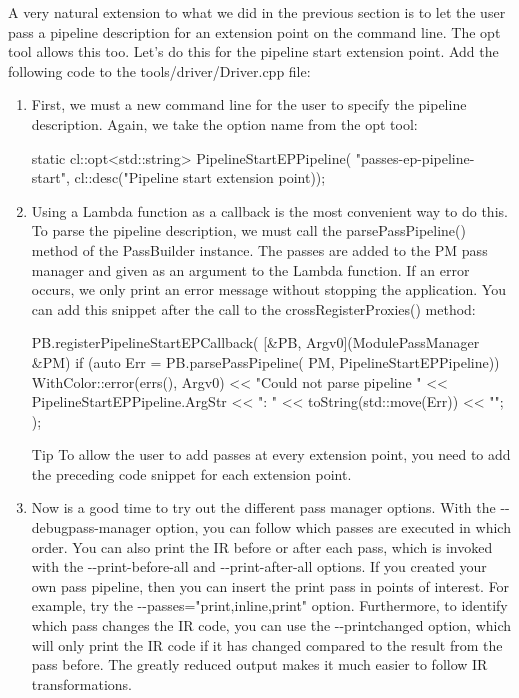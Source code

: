 A very natural extension to what we did in the previous section is to let the user pass a pipeline description for an extension point on the command line. The opt tool allows this too. Let’s do this for the pipeline start extension point. Add the following code to the tools/driver/Driver.cpp file:

\begin{enumerate}
\item
First, we must a new command line for the user to specify the pipeline description. Again, we take the option name from the opt tool:

\begin{cpp}
static cl::opt<std::string> PipelineStartEPPipeline(
    "passes-ep-pipeline-start",
    cl::desc("Pipeline start extension point));
\end{cpp}

\item
Using a Lambda function as a callback is the most convenient way to do this. To parse the pipeline description, we must call the parsePassPipeline() method of the PassBuilder instance. The passes are added to the PM pass manager and given as an argument to the Lambda function. If an error occurs, we only print an error message without stopping the application. You can add this snippet after the call to the crossRegisterProxies() method:

\begin{cpp}
PB.registerPipelineStartEPCallback(
[&PB, Argv0](ModulePassManager &PM) {
    if (auto Err = PB.parsePassPipeline(
            PM, PipelineStartEPPipeline)) {
        WithColor::error(errs(), Argv0)
            << "Could not parse pipeline "
            << PipelineStartEPPipeline.ArgStr << ": "
            << toString(std::move(Err)) << "\n";
    }
});
\end{cpp}

\begin{myTip}{Tip}
To allow the user to add passes at every extension point, you need to add the preceding code snippet for each extension point.
\end{myTip}

\item
Now is a good time to try out the different pass manager options. With the -{}-debugpass-manager option, you can follow which passes are executed in which order. You can also print the IR before or after each pass, which is invoked with the -{}-print-before-all and -{}-print-after-all options. If you created your own pass pipeline, then you can insert the print pass in points of interest. For example, try the -{}-passes="print,inline,print" option. Furthermore, to identify which pass changes the IR code, you can use the -{}-printchanged option, which will only print the IR code if it has changed compared to the result from the pass before. The greatly reduced output makes it much easier to follow IR transformations.


\end{enumerate}
